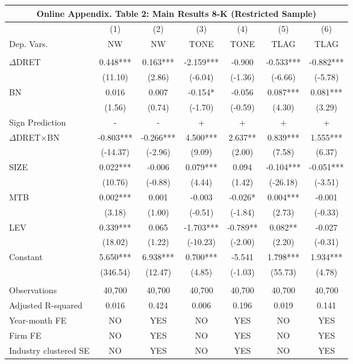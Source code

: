 \begin{table}[htbp] \label{oat2}
  \centering
    \begin{tabular}{lcccccc}
    \multicolumn{7}{c}{\textbf{Online Appendix. Table 2: Main Results 8-K (Restricted Sample)}} \\
    \midrule
      & (1) & (2) & (3) & (4) & (5) & (6) \\
    Dep. Vars. & NW & NW & TONE & TONE & TLAG & TLAG \\
    \midrule
      &   &   &   &   &   &  \\
    $\Delta$DRET & 0.448*** & 0.163*** & -2.159*** & -0.900 & -0.533*** & -0.882*** \\
    & (11.10) & (2.86) & (-6.04) & (-1.36) & (-6.66) & (-5.78) \\
    BN & 0.016 & 0.007 & -0.154* & -0.056 & 0.087*** & 0.081*** \\
    & (1.56) & (0.74) & (-1.70) & (-0.59) & (4.30) & (3.29) \\
    \rowcolor[rgb]{ .933,  .925,  .882} Sign Prediction & - & - & + & + & + & + \\
    \rowcolor[rgb]{ .933,  .925,  .882} $\Delta$DRET$\times$BN & -0.803*** & -0.266*** & 4.500*** & 2.637** & 0.839*** & 1.555*** \\
    \rowcolor[rgb]{ .933,  .925,  .882}   & (-14.37) & (-2.96) & (9.09) & (2.00) & (7.58) & (6.37) \\
    SIZE & 0.022*** & -0.006 & 0.079*** & 0.094 & -0.104*** & -0.051*** \\
    & (10.76) & (-0.88) & (4.44) & (1.42) & (-26.18) & (-3.51) \\
    MTB & 0.002*** & 0.001 & -0.003 & -0.026* & 0.004*** & -0.001 \\
    & (3.18) & (1.00) & (-0.51) & (-1.84) & (2.73) & (-0.33) \\
    LEV & 0.339*** & 0.065 & -1.703*** & -0.789** & 0.082** & -0.027 \\
    & (18.02) & (1.22) & (-10.23) & (-2.00) & (2.20) & (-0.31) \\
    Constant & 5.650*** & 6.938*** & 0.700*** & -5.541 & 1.798*** & 1.934*** \\
    & (346.54) & (12.47) & (4.85) & (-1.03) & (55.73) & (4.78) \\
    &   &   &   &   &   &  \\
    Observations & 40,700 & 40,700 & 40,700 & 40,700 & 40,700 & 40,700 \\
    Adjusted R-squared & 0.016 & 0.424 & 0.006 & 0.196 & 0.019 & 0.141 \\
    Year-month FE & NO & YES & NO & YES & NO & YES \\
    Firm FE & NO & YES & NO & YES & NO & YES \\
    Industry clustered SE & NO & YES & NO & YES & NO & YES \\
    \bottomrule
    \end{tabular}%
\end{table}%